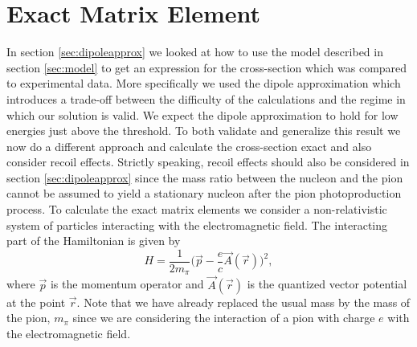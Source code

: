 \section{Exact Matrix Element}\label{sec:exact}
In section \ref{sec:dipoleapprox} we looked at how to use the model described in section \ref{sec:model} to get an expression for the cross-section which was compared to experimental data. More specifically we used the dipole approximation which introduces a trade-off between the difficulty of the calculations and the regime in which our solution is valid. We expect the dipole approximation to hold for low energies just above the threshold. To both validate and generalize this result we now do a different approach and calculate the cross-section exact and also consider recoil effects. Strictly speaking, recoil effects should also be considered in section \ref{sec:dipoleapprox} since the mass ratio between the nucleon and the pion cannot be assumed to yield a stationary nucleon after the pion photoproduction process. To calculate the exact matrix elements we consider a non-relativistic system of particles interacting with the electromagnetic field. The interacting part of the Hamiltonian is given by
\begin{equation} \label{firstinthamil}
	H = \frac{1}{2m_\pi} \bigg( \vec{p}-\frac{e}{c}\vec{A}(\vec{r}) \bigg)^2,
\end{equation}
where $\vec{p}$ is the momentum operator and $\vec{A}(\vec{r})$ is the quantized vector potential at the point $\vec{r}$. Note that we have already replaced the usual mass by the mass of the pion, $m_\pi$ since we are considering the interaction of a pion with charge $e$ with the electromagnetic field. 

